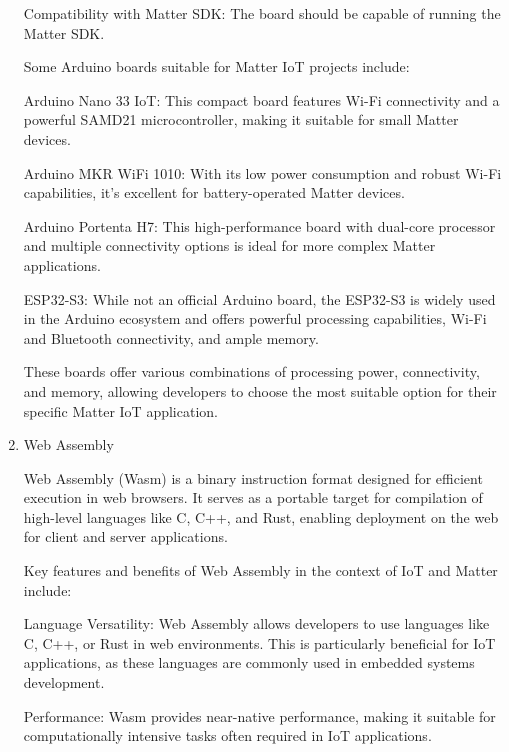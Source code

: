 \documentclass[conference]{IEEEtran}
\begin{document}
\begin{enumerate}[itemsep=2ex, parsep=1ex]
	      Compatibility with Matter SDK: The board should be capable of running the Matter
	      SDK.
	      	      	      
	      Some Arduino boards suitable for Matter IoT projects include:
	      	      	      
	      Arduino Nano 33 IoT: This compact board features Wi-Fi connectivity and a
	      powerful SAMD21 microcontroller, making it suitable for small Matter devices.
	      	      	      
	      Arduino MKR WiFi 1010: With its low power consumption and robust Wi-Fi
	      capabilities, it's excellent for battery-operated Matter devices.
	      	      	      
	      Arduino Portenta H7: This high-performance board with dual-core processor
	      and multiple connectivity options is ideal for more complex Matter
	      applications.
	      	      	      
	      ESP32-S3: While not an official Arduino board, the ESP32-S3 is widely used
	      in the Arduino ecosystem and offers powerful processing capabilities, Wi-Fi
	      and Bluetooth connectivity, and ample memory.
	      	      	      
	      These boards offer various combinations of processing power, connectivity,
	      and memory, allowing developers to choose the most suitable option for their
	      specific Matter IoT application.
	      	      	      
	\item Web Assembly
	      	      	      
	      Web Assembly (Wasm) is a binary instruction format designed for efficient
	      execution in web browsers. It serves as a portable target for compilation of
	      high-level languages like C, C++, and Rust, enabling deployment on the web
	      for client and server applications.
	      	      	      
	      Key features and benefits of Web Assembly in the context of IoT and Matter
	      include:
	      	      	      
	      Language Versatility: Web Assembly allows developers to use languages like
	      C, C++, or Rust in web environments. This is particularly beneficial for
	      IoT applications, as these languages are commonly used in embedded systems
	      development.
	      	      	      
	      Performance: Wasm provides near-native performance, making it suitable for
	      computationally intensive tasks often required in IoT applications.
	      	      	      

\end{enumerate}
\end{document}
